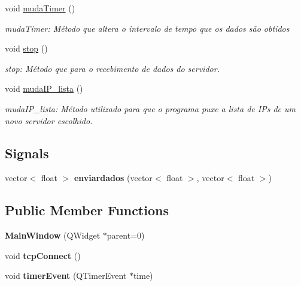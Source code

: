 \begin{DoxyCompactItemize}
\mbox{\label{class_main_window_aece55c280ac690cd215dccb09a40add4}} 
void \hyperlink{class_main_window_aece55c280ac690cd215dccb09a40add4}{muda\+Timer} ()
\begin{DoxyCompactList}\small\item\em muda\+Timer\+: Método que altera o intervalo de tempo que os dados são obtidos \end{DoxyCompactList}\item 
\mbox{\label{class_main_window_a939e90ddfe07d74be87b351ca2171fb0}} 
void \hyperlink{class_main_window_a939e90ddfe07d74be87b351ca2171fb0}{stop} ()
\begin{DoxyCompactList}\small\item\em stop\+: Método que para o recebimento de dados do servidor. \end{DoxyCompactList}\item 
\mbox{\label{class_main_window_a799590b27ee9368ec2836084e80e0115}} 
void \hyperlink{class_main_window_a799590b27ee9368ec2836084e80e0115}{muda\+I\+P\+\_\+lista} ()
\begin{DoxyCompactList}\small\item\em muda\+I\+P\+\_\+lista\+: Método utilizado para que o programa puxe a lista de I\+Ps de um novo servidor escolhido. \end{DoxyCompactList}\end{DoxyCompactItemize}
\subsection*{Signals}
\begin{DoxyCompactItemize}
\item 
\mbox{\label{class_main_window_a11b1eb7d841034cd2f30e369071f2a8e}} 
vector$<$ float $>$ {\bfseries enviardados} (vector$<$ float $>$, vector$<$ float $>$)
\end{DoxyCompactItemize}
\subsection*{Public Member Functions}
\begin{DoxyCompactItemize}
\item 
\mbox{\label{class_main_window_a8b244be8b7b7db1b08de2a2acb9409db}} 
{\bfseries Main\+Window} (Q\+Widget $\ast$parent=0)
\item 
\mbox{\label{class_main_window_ac5b669957c442b6eb68573dacfce33e1}} 
void {\bfseries tcp\+Connect} ()
\item 
\mbox{\label{class_main_window_a64b82f5df1188f632d5aef730f0c6d1a}} 
void {\bfseries timer\+Event} (Q\+Timer\+Event $\ast$time)
\end{DoxyCompactItemize}


